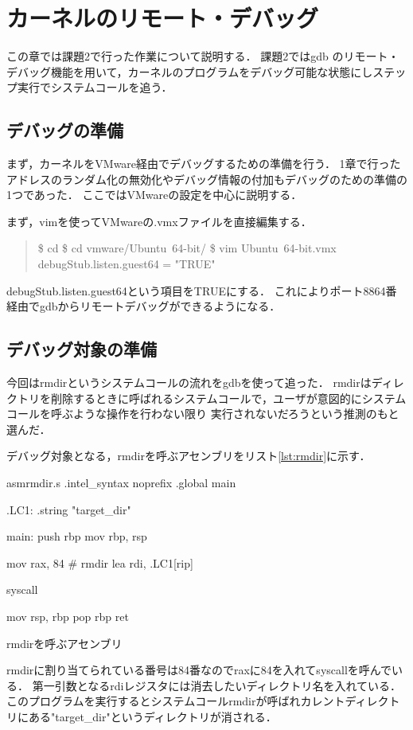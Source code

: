 \chapter{カーネルのリモート・デバッグ}
この章では課題2で行った作業について説明する．
課題2ではgdb のリモート・デバッグ機能を用いて，カーネルのプログラムをデバッグ可能な状態にしステップ実行でシステムコールを追う．

\section{デバッグの準備}
まず，カーネルをVMware経由でデバッグするための準備を行う．
1章で行ったアドレスのランダム化の無効化やデバッグ情報の付加もデバッグのための準備の1つであった．
ここではVMwareの設定を中心に説明する．

まず，vimを使ってVMwareの.vmxファイルを直接編集する．
\begin{quote}
\$ cd 
\$ cd vmware/Ubuntu\ 64-bit/
\$ vim Ubuntu\ 64-bit.vmx
debugStub.listen.guest64 = "TRUE"
\end{quote}

debugStub.listen.guest64という項目をTRUEにする．
これによりポート8864番経由でgdbからリモートデバッグができるようになる．

\section{デバッグ対象の準備}
今回はrmdirというシステムコールの流れをgdbを使って追った．
rmdirはディレクトリを削除するときに呼ばれるシステムコールで，ユーザが意図的にシステムコールを呼ぶような操作を行わない限り
実行されないだろうという推測のもと選んだ．

デバッグ対象となる，rmdirを呼ぶアセンブリをリスト\ref{lst:rmdir}に示す．
\begin{longlisting}
\begin{myminted}{asm}{rmdir.s}
.intel_syntax noprefix
.global main

.LC1:
    .string "target_dir"

main:
    push rbp
    mov rbp, rsp

    mov rax, 84 # rmdir
    lea rdi, .LC1[rip]

    syscall

    mov rsp, rbp
    pop rbp
    ret
\end{myminted}
    \caption{rmdirを呼ぶアセンブリ}
\label{lst:rmdir}
\end{longlisting}

rmdirに割り当てられている番号は84番\cite{syscall}なのでraxに84を入れてsyscallを呼んでいる．
第一引数となるrdiレジスタには消去したいディレクトリ名を入れている．
このプログラムを実行するとシステムコールrmdirが呼ばれカレントディレクトリにある"target\_dir"というディレクトリが消される．


